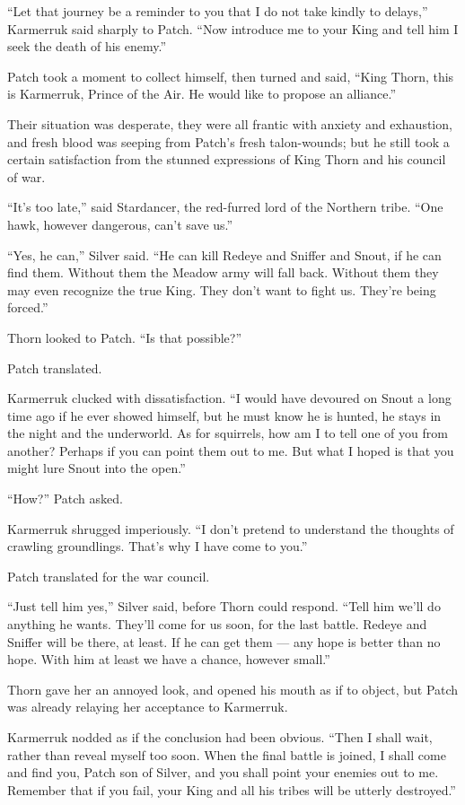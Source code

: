 \documentclass[ebook,oneside,openany,12pt]{memoir}
\begin{document}
“Let that journey be a reminder to you that I do not take kindly to
delays,” Karmerruk said sharply to Patch. “Now introduce me to your
King and tell him I seek the death of his enemy.”

Patch took a moment to collect himself, then turned and said, “King
Thorn, this is Karmerruk, Prince of the Air. He would like to propose
an alliance.”

Their situation was desperate, they were all frantic with anxiety and
exhaustion, and fresh blood was seeping from Patch’s fresh
talon-wounds; but he still took a certain satisfaction from the
stunned expressions of King Thorn and his council of war.

“It’s too late,” said Stardancer, the red-furred lord of the Northern
tribe. “One hawk, however dangerous, can’t save us.”

“Yes, he can,” Silver said. “He can kill Redeye and Sniffer and Snout,
if he can find them. Without them the Meadow army will fall
back. Without them they may even recognize the true King. They don’t
want to fight us. They’re being forced.”

Thorn looked to Patch. “Is that possible?”

Patch translated.

Karmerruk clucked with dissatisfaction. “I would have devoured on
Snout a long time ago if he ever showed himself, but he must know he
is hunted, he stays in the night and the underworld. As for squirrels,
how am I to tell one of you from another? Perhaps if you can point
them out to me. But what I hoped is that you might lure Snout into the
open.”

“How?” Patch asked.

Karmerruk shrugged imperiously. “I don’t pretend to understand the
thoughts of crawling groundlings. That’s why I have come to you.”

Patch translated for the war council.

“Just tell him yes,” Silver said, before Thorn could respond. “Tell
him we’ll do anything he wants. They’ll come for us soon, for the last
battle. Redeye and Sniffer will be there, at least. If he can get them
— any hope is better than no hope. With him at least we have a chance,
however small.”

Thorn gave her an annoyed look, and opened his mouth as if to object,
but Patch was already relaying her acceptance to Karmerruk.

Karmerruk nodded as if the conclusion had been obvious. “Then I shall
wait, rather than reveal myself too soon. When the final battle is
joined, I shall come and find you, Patch son of Silver, and you shall
point your enemies out to me. Remember that if you fail, your King and
all his tribes will be utterly destroyed.”
\end{document}
